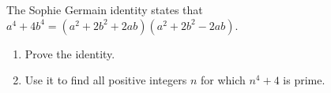 The Sophie Germain identity states that $a^4+4b^4=(a^2+2b^2+2ab)(a^2+2b^2-2ab)$.
\begin{enumerate}
\item[(a)] Prove the identity.
\item[(b)] Use it to find all positive integers $n$ for which $n^4+4$ is prime.
\end{enumerate}
